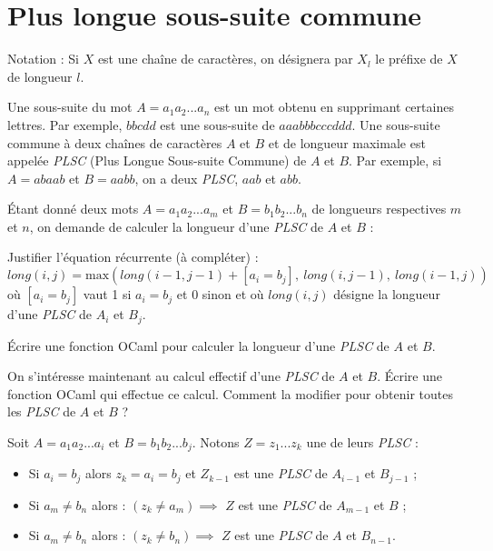 \renewcommand{\SourceFile}{2-jouer-avec-les-mots/src/2-6.ml}

\section{Plus longue sous-suite commune}

Notation : Si $X$ est une chaîne de caractères, on désignera par $X_l$ le préfixe de $X$ de longueur $l$.
\medskip

Une sous-suite du mot $A=a_1a_2...a_n$ est un mot obtenu en supprimant certaines lettres. Par exemple, $bbcdd$ est une sous-suite de $aaabbbcccddd$. Une sous-suite commune à deux chaînes de caractères $A$ et $B$ et de longueur maximale est appelée \textit{PLSC} (Plus Longue Sous-suite Commune) de $A$ et $B$. Par exemple, si $A=abaab$ et $B=aabb$, on a deux \textit{PLSC}, $aab$ et $abb$.

\Q
Étant donné deux mots $A=a_1a_2...a_m$ et $B=b_1b_2...b_n$ de longueurs respectives $m$ et $n$, on demande de calculer la longueur d'une \textit{PLSC} de $A$ et $B$ :
\medskip

Justifier l'équation récurrente (à compléter) :
\[
    long(i, j) = \textrm{max}(long(i-1, j-1) + [a_i=b_j],\ long(i,j-1),\ long(i-1,j))
\]
où $[a_i=b_j]$ vaut 1 si $a_i=b_j$ et 0 sinon et où $long(i,j)$ désigne la longueur d'une \textit{PLSC} de $A_i$ et $B_j$.
\medskip

Écrire une fonction OCaml pour calculer la longueur d'une \textit{PLSC} de $A$ et $B$.

\Q
On s'intéresse maintenant au calcul effectif d'une \textit{PLSC} de $A$ et $B$. Écrire une fonction OCaml qui effectue ce calcul. Comment la modifier pour obtenir toutes les \textit{PLSC} de $A$ et $B$ ?

\Corrige

\Q
Soit $A=a_1a_2...a_i$ et $B=b_1b_2...b_j$.
Notons $Z=z_1...z_k$ une de leurs \textit{PLSC} :

\begin{itemize}
    \item Si $a_i=b_j$ alors $z_k=a_i=b_j$ et $Z_{k-1}$ est une \textit{PLSC} de $A_{i-1}$ et $B_{j-1}$ ;
    \item Si $a_m \neq b_n$ alors : $(z_k \neq a_m) \implies$ $Z$ est une \textit{PLSC} de $A_{m-1}$ et $B$ ;
    \item Si $a_m \neq b_n$ alors : $(z_k \neq b_n) \implies$ $Z$ est une \textit{PLSC} de $A$ et $B_{n-1}$.
\end{itemize}

